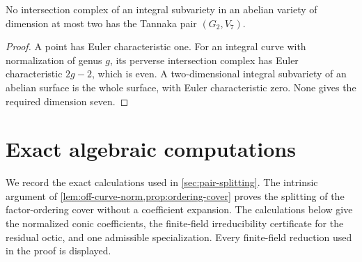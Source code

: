 \begin{corollary}
No intersection complex of an integral subvariety in an abelian variety
of dimension at most two has the Tannaka pair $(G_2,V_7)$.
\end{corollary}
\begin{proof}
A point has Euler characteristic one.  For an integral curve with
normalization of genus $g$, its perverse intersection complex has Euler
characteristic $2g-2$, which is even.  A two-dimensional integral
subvariety of an abelian surface is the whole surface, with Euler
characteristic zero.  None gives the required dimension seven.
\end{proof}

\appendix

\section{Exact algebraic computations}\label{app:exact-norm}

We record the exact calculations used in \cref{sec:pair-splitting}.  The
intrinsic argument of \cref{lem:off-curve-norm,prop:ordering-cover} proves the
splitting of the factor-ordering cover without a coefficient expansion.  The
calculations below give the normalized conic coefficients, the finite-field
irreducibility certificate for the residual octic, and one admissible
specialization.  Every finite-field reduction used in the proof is displayed.

